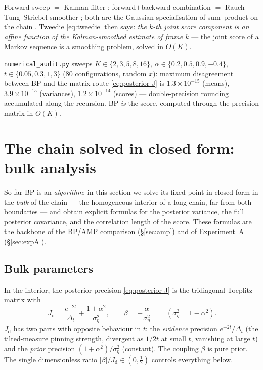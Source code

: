 \documentclass[11pt]{article}
\theoremstyle{definition}
\newcommand{\Dt}{\Delta_t}
\newcommand{\Jd}{J_{\mathrm d}}
\begin{document}
\begin{intuition}
Forward sweep $=$ Kalman filter \citep{kalman1960}; forward$+$backward
combination $=$ Rauch--Tung--Striebel smoother \citep{rauchtungstriebel1965};
both are the Gaussian specialisation of sum--product on the chain
\citep{kschischang2001factor,bishop2006pattern}. Tweedie
\eqref{eq:tweedie} then says: \emph{the $k$-th joint score component is an
affine function of the Kalman-smoothed estimate of frame $k$} --- the joint
score of a Markov sequence is a smoothing problem, solved in $O(K)$.
\end{intuition}

\begin{auditbox}
\texttt{numerical\_audit.py} sweeps $K\in\{2,3,5,8,16\}$,
$\alpha\in\{0.2,0.5,0.9,-0.4\}$, $t\in\{0.05,0.3,1,3\}$ (80 configurations,
random $x$): maximum disagreement between BP and the matrix route
\eqref{eq:posterior-J} is $1.3\times10^{-15}$ (means),
$3.9\times10^{-15}$ (variances), $1.2\times10^{-14}$ (scores) ---
double-precision rounding accumulated along the recursion. BP \emph{is} the
score, computed through the precision matrix in $O(K)$.
\end{auditbox}

\section{The chain solved in closed form: bulk analysis}\label{sec:bulk}

So far BP is an \emph{algorithm}; in this section we solve its fixed point in
closed form in the \emph{bulk} of the chain --- the homogeneous interior of a
long chain, far from both boundaries --- and obtain explicit formulas for the
posterior variance, the full posterior covariance, and the correlation length
of the score. These formulas are the backbone of the BP/AMP comparison
(\S\ref{sec:amp}) and of Experiment~A (\S\ref{sec:expA}).

\subsection{Bulk parameters}

In the interior, the posterior precision \eqref{eq:posterior-J} is the
tridiagonal Toeplitz matrix with
\begin{equation}\label{eq:bulk-params}
  \boxed{\ \Jd=\frac{e^{-2t}}{\Dt}+\frac{1+\alpha^2}{\sigma_\eta^2},
  \qquad
  \beta=-\frac{\alpha}{\sigma_\eta^2}\ }\qquad(\sigma_\eta^2=1-\alpha^2).
\end{equation}
$\Jd$ has two parts with opposite behaviour in $t$: the \emph{evidence}
precision $e^{-2t}/\Dt$ (the tilted-measure pinning strength, divergent as
$1/2t$ at small $t$, vanishing at large $t$) and the \emph{prior} precision
$(1+\alpha^2)/\sigma_\eta^2$ (constant). The coupling $\beta$ is pure prior.
The single dimensionless ratio $|\beta|/\Jd\in(0,\tfrac12)$ controls
everything below.
\end{document}
